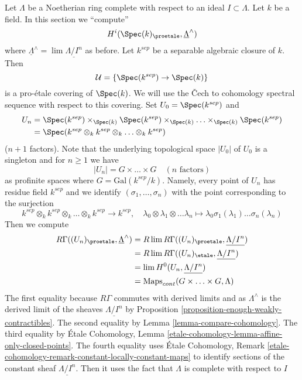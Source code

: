 \noindent
Let $\Lambda$ be a Noetherian ring complete with respect to an ideal
$I \subset \Lambda$. Let $k$ be a field. In this section we ``compute''
$$
H^i(\Spec(k)_\proetale, \underline{\Lambda}^\wedge)
$$
where $\underline{\Lambda}^\wedge = \lim \underline{\Lambda/I^n}$ as before.
Let $k^{sep}$ be a separable algebraic closure of $k$.
Then
$$
\mathcal{U} = \{\Spec(k^{sep}) \to \Spec(k)\}
$$
is a pro-\'etale covering of $\Spec(k)$. We will use the {\v C}ech
to cohomology spectral sequence with respect to this covering.
Set $U_0 = \Spec(k^{sep})$ and
\begin{align*}
U_n & =
\Spec(k^{sep}) \times_{\Spec(k)}
\Spec(k^{sep}) \times_{\Spec(k)} \ldots
\times_{\Spec(k)} \Spec(k^{sep}) \\
& =
\Spec(k^{sep} \otimes_k k^{sep} \otimes_k \ldots \otimes_k k^{sep})
\end{align*}
($n + 1$ factors). Note that the underlying topological space
$|U_0|$ of $U_0$ is a singleton and for $n \geq 1$ we have
$$
|U_n| = G \times \ldots \times G\quad (n\text{ factors})
$$
as profinite spaces where $G = \text{Gal}(k^{sep}/k)$. Namely, every
point of $U_n$ has residue field $k^{sep}$ and we identify
$(\sigma_1, \ldots, \sigma_n)$ with the point corresponding to the
surjection
$$
k^{sep} \otimes_k k^{sep} \otimes_k \ldots \otimes_k k^{sep}
\longrightarrow k^{sep}, \quad
\lambda_0 \otimes \lambda_1 \otimes \ldots \lambda_n
\longmapsto \lambda_0 \sigma_1(\lambda_1) \ldots \sigma_n(\lambda_n)
$$
Then we compute
\begin{align*}
R\Gamma((U_n)_\proetale, \underline{\Lambda}^\wedge)
& =
R\lim R\Gamma((U_n)_\proetale, \underline{\Lambda/I^n}) \\
& =
R\lim R\Gamma((U_n)_\etale, \underline{\Lambda/I^n}) \\
& =
\lim H^0(U_n, \underline{\Lambda/I^n}) \\
& = 
\text{Maps}_{cont}(G \times \ldots \times G, \Lambda)
\end{align*}
The first equality because $R\Gamma$ commutes with derived limits
and as $\Lambda^\wedge$ is the derived limit of the sheaves
$\underline{\Lambda/I^n}$ by
Proposition \ref{proposition-enough-weakly-contractibles}.
The second equality by Lemma \ref{lemma-compare-cohomology}.
The third equality by \'Etale Cohomology, Lemma
\ref{etale-cohomology-lemma-affine-only-closed-points}.
The fourth equality uses
\'Etale Cohomology, Remark
\ref{etale-cohomology-remark-constant-locally-constant-maps}
to identify sections of the constant sheaf $\underline{\Lambda/I^n}$.
Then it uses the fact that $\Lambda$ is complete with respect to $I$

